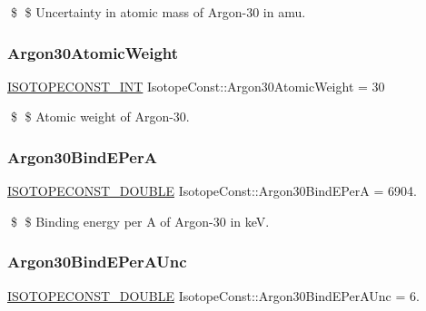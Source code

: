 \$ \$ Uncertainty in atomic mass of Argon-\/30 in amu. \mbox{\label{group___isotope_const-_argon-_ar30_ga42bf25b52ba36af9a4694a3529913161}} 
\subsubsection{\texorpdfstring{Argon30\+Atomic\+Weight}{Argon30AtomicWeight}}
{\footnotesize\ttfamily \mbox{\hyperlink{group___isotope_const-_macros_ga5f18360b3e99483a35c32d789e62621c}{I\+S\+O\+T\+O\+P\+E\+C\+O\+N\+S\+T\+\_\+\+I\+NT}} Isotope\+Const\+::\+Argon30\+Atomic\+Weight = 30}

\$ \$ Atomic weight of Argon-\/30. \mbox{\label{group___isotope_const-_argon-_ar30_ga9f6d3bebc064cf69018a884a74de8a88}} 
\subsubsection{\texorpdfstring{Argon30\+Bind\+E\+PerA}{Argon30BindEPerA}}
{\footnotesize\ttfamily \mbox{\hyperlink{group___isotope_const-_macros_ga8f45a7272ce02c0b4c65c44636ed719a}{I\+S\+O\+T\+O\+P\+E\+C\+O\+N\+S\+T\+\_\+\+D\+O\+U\+B\+LE}} Isotope\+Const\+::\+Argon30\+Bind\+E\+PerA = 6904.}

\$ \$ Binding energy per A of Argon-\/30 in keV. \mbox{\label{group___isotope_const-_argon-_ar30_gabe13c7771424b43166458f8f07def0f2}} 
\subsubsection{\texorpdfstring{Argon30\+Bind\+E\+Per\+A\+Unc}{Argon30BindEPerAUnc}}
{\footnotesize\ttfamily \mbox{\hyperlink{group___isotope_const-_macros_ga8f45a7272ce02c0b4c65c44636ed719a}{I\+S\+O\+T\+O\+P\+E\+C\+O\+N\+S\+T\+\_\+\+D\+O\+U\+B\+LE}} Isotope\+Const\+::\+Argon30\+Bind\+E\+Per\+A\+Unc = 6.}

